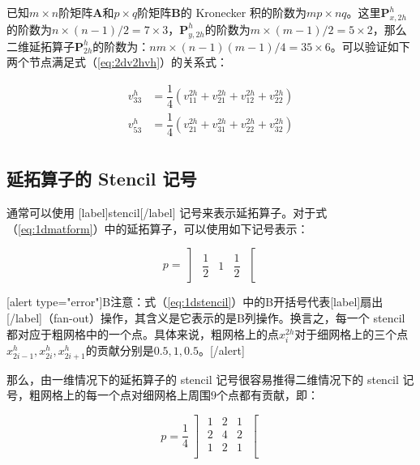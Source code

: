 \documentclass[12pt, UTF8, nofonts]{ctexart}
\begin{document}
已知$m \times n$阶矩阵$\boldsymbol{A}$和$p \times q$阶矩阵$\boldsymbol{B}$的 Kronecker 积的阶数为$mp \times nq$。这里$\boldsymbol{P}_{x,2h}^{h}$的阶数为$n\times(n-1)/2=7\times3$，$\boldsymbol{P}_{y,2h}^h$的阶数为$m\times(m-1)/2=5\times2$，那么二维延拓算子$\boldsymbol{P}_{2h}^{h}$的阶数为：$nm \times (n-1)(m-1)/4 = 35 \times 6$。可以验证如下两个节点满足式（\ref{eq:2dv2hvh}）的关系式：

\[
  \begin{aligned}
    v_{33}^{h} &= \dfrac{1}{4}\left(v_{11}^{2h} + v_{21}^{2h} + v_{12}^{2h} + v_{22}^{2h}\right) \\
    v_{53}^{h} &= \dfrac{1}{4}\left(v_{21}^{2h} + v_{31}^{2h} + v_{22}^{2h} + v_{32}^{2h}\right) \\
  \end{aligned}
\]

\subsection*{延拓算子的 Stencil 记号}

通常可以使用 [label]stencil[/label] 记号来表示延拓算子。对于式（\ref{eq:1dmatform}）中的延拓算子，可以使用如下记号表示：

\begin{equation}
  \label{eq:1dstencil}
  p = \left]\begin{matrix}
    \dfrac{1}{2} & 1 & \dfrac{1}{2}
  \end{matrix}\right[
\end{equation}

[alert type="error"]B注意：式（\ref{eq:1dstencil}）中的B开括号代表[label]扇出[/label]（fan-out）操作，其含义是它表示的是B列操作。换言之，每一个 stencil 都对应于粗网格中的一个点。具体来说，粗网格上的点$x_{i}^{2h}$对于细网格上的三个点$x_{2i-1}^{h},x_{2i}^h,x_{2i+1}^h$的贡献分别是$0.5,1,0.5$。[/alert]

那么，由一维情况下的延拓算子的 stencil 记号很容易推得二维情况下的 stencil 记号，粗网格上的每一个点对细网格上周围$9$个点都有贡献，即：

\begin{equation}
  \label{eq:2dstencil}
  p = \dfrac{1}{4}
  \left]\begin{matrix}
    1 & 2 & 1 \\
    2 & 4 & 2 \\
    1 & 2 & 1 \\
  \end{matrix}\right[
\end{equation}
\end{document}
